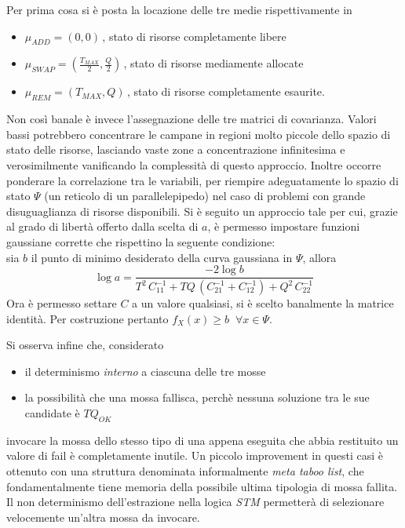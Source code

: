 	Per prima cosa si è posta la locazione delle tre medie rispettivamente in
	\begin{itemize}
	  \item $\mu_{ADD} = (0,0)\,$, stato di risorse completamente libere
	  \item $\mu_{SWAP} = (\frac{T_{MAX}}2,\frac{Q}2)\,$, stato di risorse mediamente allocate
	  \item $\mu_{REM} =(T_{MAX},Q)\,$, stato di risorse completamente esaurite.
	\end{itemize}
	Non così banale è invece l'assegnazione delle tre matrici di covarianza. Valori bassi potrebbero concentrare le campane in regioni molto piccole
	dello spazio di stato delle risorse, lasciando vaste zone a concentrazione infinitesima e verosimilmente vanificando la complessità di questo approccio.
	Inoltre occorre ponderare la correlazione tra le variabili, per riempire adeguatamente lo spazio di stato $\Psi$ (un reticolo di un parallelepipedo) nel
	caso di problemi con grande disuguaglianza di risorse disponibili.
	Si è seguito un approccio tale per cui, grazie al grado di libertà offerto dalla scelta di $a$, è permesso impostare funzioni gaussiane corrette che
	rispettino la seguente condizione: \\
	sia $b$ il punto di minimo desiderato della curva gaussiana in $\Psi$, allora 
	$$ \log a = \frac{-2\log b}{T^2\,C^{-1}_{11} + TQ\, (C^{-1}_{21} + C^{-1}_{12}) + Q^2\,C^{-1}_{22}} $$
	Ora è permesso settare $C$ a un valore qualsiasi, si è scelto banalmente la matrice identità. Per costruzione pertanto $f_X(x) \geq b \;\;\forall x \in \Psi$.
	
	
	Si osserva infine che, considerato
	\begin{itemize}
	  \item il determinismo \emph{interno} a ciascuna delle tre mosse
	  \item la possibilità che una mossa fallisca, perchè nessuna soluzione tra le sue candidate è $TQ_{OK}$
	\end{itemize}
	invocare la mossa dello stesso tipo di una appena eseguita che abbia restituito un valore di fail è completamente inutile.
	Un piccolo improvement in questi casi è ottenuto con una struttura denominata informalmente \emph{meta taboo list}, che fondamentalmente tiene
	memoria della possibile ultima tipologia di mossa fallita. Il non determinismo dell'estrazione nella logica \emph{STM} permetterà di selezionare
	velocemente un'altra mossa da invocare.